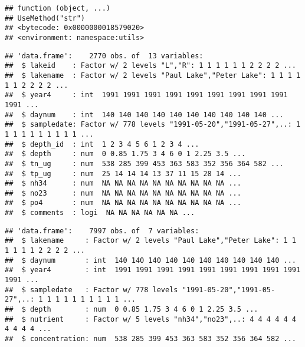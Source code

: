 \documentclass[]{article}
\newenvironment{Shaded}{\begin{snugshade}}{\end{snugshade}}
\newcommand{\KeywordTok}[1]{\textcolor[rgb]{0.13,0.29,0.53}{\textbf{#1}}}
\newcommand{\DataTypeTok}[1]{\textcolor[rgb]{0.13,0.29,0.53}{#1}}
\newcommand{\StringTok}[1]{\textcolor[rgb]{0.31,0.60,0.02}{#1}}
\newcommand{\CommentTok}[1]{\textcolor[rgb]{0.56,0.35,0.01}{\textit{#1}}}
\newcommand{\OperatorTok}[1]{\textcolor[rgb]{0.81,0.36,0.00}{\textbf{#1}}}
\newcommand{\NormalTok}[1]{#1}
\begin{document}
\begin{verbatim}
## function (object, ...) 
## UseMethod("str")
## <bytecode: 0x0000000018579020>
## <environment: namespace:utils>
\end{verbatim}

\begin{Shaded}
\end{Shaded}

\begin{verbatim}
## 'data.frame':    2770 obs. of  13 variables:
##  $ lakeid    : Factor w/ 2 levels "L","R": 1 1 1 1 1 1 2 2 2 2 ...
##  $ lakename  : Factor w/ 2 levels "Paul Lake","Peter Lake": 1 1 1 1 1 1 2 2 2 2 ...
##  $ year4     : int  1991 1991 1991 1991 1991 1991 1991 1991 1991 1991 ...
##  $ daynum    : int  140 140 140 140 140 140 140 140 140 140 ...
##  $ sampledate: Factor w/ 778 levels "1991-05-20","1991-05-27",..: 1 1 1 1 1 1 1 1 1 1 ...
##  $ depth_id  : int  1 2 3 4 5 6 1 2 3 4 ...
##  $ depth     : num  0 0.85 1.75 3 4 6 0 1 2.25 3.5 ...
##  $ tn_ug     : num  538 285 399 453 363 583 352 356 364 582 ...
##  $ tp_ug     : num  25 14 14 14 13 37 11 15 28 14 ...
##  $ nh34      : num  NA NA NA NA NA NA NA NA NA NA ...
##  $ no23      : num  NA NA NA NA NA NA NA NA NA NA ...
##  $ po4       : num  NA NA NA NA NA NA NA NA NA NA ...
##  $ comments  : logi  NA NA NA NA NA NA ...
\end{verbatim}

\begin{Shaded}
\end{Shaded}

\begin{verbatim}
## 'data.frame':    7997 obs. of  7 variables:
##  $ lakename     : Factor w/ 2 levels "Paul Lake","Peter Lake": 1 1 1 1 1 1 2 2 2 2 ...
##  $ daynum       : int  140 140 140 140 140 140 140 140 140 140 ...
##  $ year4        : int  1991 1991 1991 1991 1991 1991 1991 1991 1991 1991 ...
##  $ sampledate   : Factor w/ 778 levels "1991-05-20","1991-05-27",..: 1 1 1 1 1 1 1 1 1 1 ...
##  $ depth        : num  0 0.85 1.75 3 4 6 0 1 2.25 3.5 ...
##  $ nutrient     : Factor w/ 5 levels "nh34","no23",..: 4 4 4 4 4 4 4 4 4 4 ...
##  $ concentration: num  538 285 399 453 363 583 352 356 364 582 ...
\end{verbatim}
\end{document}
